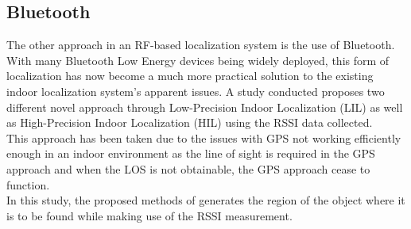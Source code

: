 \documentclass{l4proj}
\begin{document}
\subsection{Bluetooth}
The other approach in an RF-based localization system is the use of Bluetooth. With many Bluetooth Low Energy devices being widely deployed, this form of localization has now become a much more practical solution to the existing indoor localization system's apparent issues. A study conducted proposes two different novel approach through Low-Precision Indoor Localization (LIL) as well as High-Precision Indoor Localization (HIL) using the RSSI data collected.\cite{blerssi}\\
This approach has been taken due to the issues with GPS not working efficiently enough in an indoor environment as the line of sight is required in the GPS approach and when the LOS is not obtainable, the GPS approach cease to function. \cite{gpsproblem}\\
In this study, the proposed methods of generates the region of the object where it is to be found while making use of the RSSI measurement.
\end{document}
